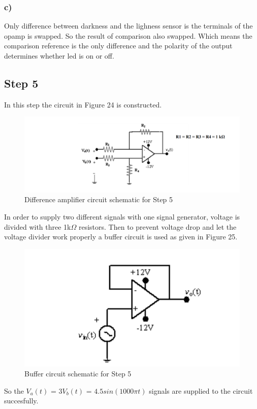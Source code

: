 \documentclass[letterpaper,12pt]{article}
\begin{document}
\subsubsection{c)}
Only difference between darkness and the lighness sensor is the terminals of the opamp is swapped. So the result of comparison also swapped. Which means the comparison reference is the only difference and the polarity of the output determines whether led is on or off.
\subsection{Step 5}
In this step the circuit in Figure 24 is constructed.
\begin{figure}[H]
	\centering
   \includegraphics[width=1\textwidth]{circuit_6.png}
   \caption{Difference amplifier circuit schematic for Step 5}
\end{figure}
In order to supply two different signals with one signal generator, voltage is divided with three 1k\(\Omega\) resistors. Then to prevent voltage drop and let the voltage divider work properly a buffer circuit is used as given in Figure 25.
\begin{figure}[H]
	\centering
   \includegraphics[width=1\textwidth]{buffer.png}
   \caption{Buffer circuit schematic for Step 5}
\end{figure}
So the \(V_a(t)\) = 3\(V_b(t)\) = \(4.5 sin(1000\pi t)\) signals are supplied to the circuit succesfully.
\end{document}
